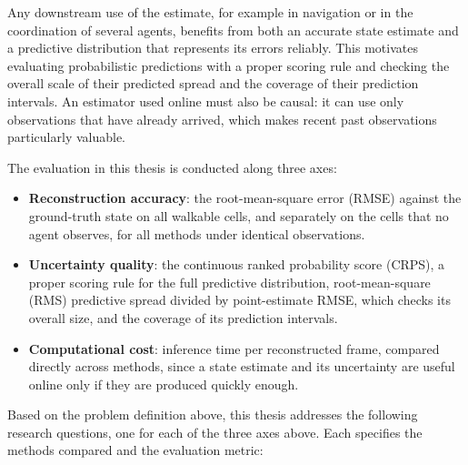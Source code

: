 \documentclass[english, 12pt, a4paper, elec, utf8, a-2b, online]{aaltothesis}
\begin{document}
Any downstream use of the estimate, for example in navigation or in the
coordination of several agents, benefits from both an accurate state estimate
and a predictive distribution that represents its errors reliably. This motivates evaluating
probabilistic predictions with a proper scoring rule and checking the overall
scale of their predicted spread and the coverage of their prediction intervals. An estimator used online must also be causal:
it can use only observations that have already arrived, which makes recent
past observations particularly valuable.


The evaluation in this thesis is conducted along three axes:

\begin{itemize}
    \item \textbf{Reconstruction accuracy}: the root-mean-square error
    (RMSE) against the ground-truth state on all walkable cells, and separately on the cells
    that no agent observes, for all methods under identical observations.
    \item \textbf{Uncertainty quality}: the continuous ranked
    probability score (CRPS), a proper scoring rule for the full predictive
    distribution, root-mean-square (RMS) predictive spread divided by point-estimate RMSE,
    which checks its overall size, and the coverage of its prediction
    intervals.
    \item \textbf{Computational cost}: inference time per
    reconstructed frame, compared directly across methods, since a state
    estimate and its uncertainty are useful online only if they are produced
    quickly enough.
\end{itemize}


Based on the problem definition above, this thesis addresses the
following research questions, one for each of the three axes above.
Each specifies the methods compared and the evaluation metric:
\end{document}
